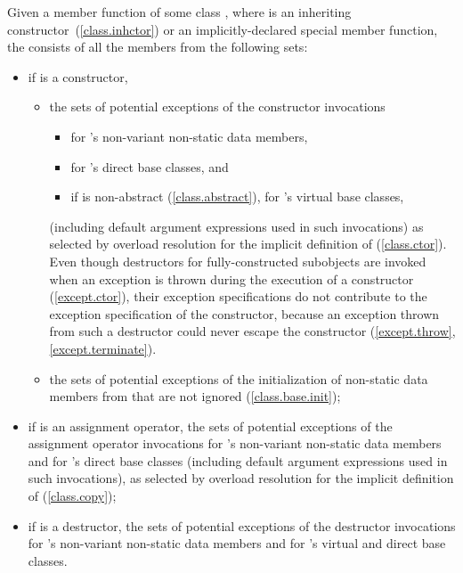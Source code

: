 \pnum
Given a member function  of some class , where  is
an inheriting constructor~(\ref{class.inhctor}) or an implicitly-declared special
member function,
the  
consists of all the members from the following sets:

\begin{itemize}
\item
if  is a constructor,
\begin{itemize}
\item
the sets of potential exceptions of the constructor invocations
\begin{itemize}
\item
for 's non-variant non-static data members,
\item
for 's direct base classes, and
\item
if  is non-abstract (\ref{class.abstract}), for 's virtual base
classes,
\end{itemize}
(including default argument expressions used in such invocations) as selected
by overload resolution for the implicit definition of  (\ref{class.ctor}).
\enternote
Even though destructors for fully-constructed subobjects are invoked
when an exception is thrown during the execution of a constructor (\ref{except.ctor}),
their exception specifications do not contribute to the
exception specification of the constructor, because
an exception thrown from such a destructor could never escape the constructor
(\ref{except.throw}, \ref{except.terminate}).
\exitnote
\item
the sets of potential exceptions of the initialization of non-static data members
from  that are not ignored (\ref{class.base.init});
\end{itemize}

\item
if  is an assignment operator, the sets of potential exceptions of
the assignment operator invocations for 's non-variant non-static
data members and for 's direct base classes (including default
argument expressions used in such invocations), as selected by overload resolution
for the implicit definition of  (\ref{class.copy});

\item
if  is a destructor, the sets of potential exceptions of the
destructor invocations for 's non-variant non-static data members
and for 's virtual and direct base classes.
\end{itemize}

